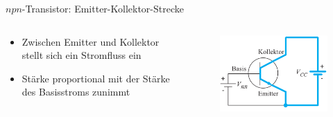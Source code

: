 \documentclass[12pt%
,aspectratio=169%
]{beamer}
\begin{document}
\begin{frame}{$npn$-Transistor: Emitter-Kollektor-Strecke}
\begin{columns}[T] %
\begin{column}{.48\textwidth}
	\begin{itemize}
		\item Zwischen Emitter und Kollektor stellt sich ein Stromfluss ein
		\item Stärke proportional mit der Stärke des Basisstroms zunimmt
	\end{itemize}
\end{column}%
\hfill%
\begin{column}{.48\textwidth}
\begin{figure}
\center
\includegraphics[scale=0.6]{pictures/ek}
\end{figure}
\end{column}%
\end{columns}
\end{frame}
\end{document}
